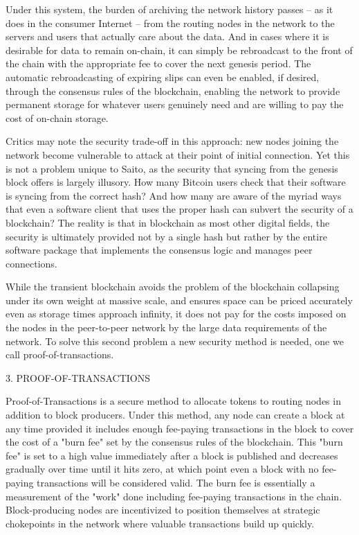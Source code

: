\documentclass[11.5pt, oneside]{article}   	%
\begin{document}
\begin{multicols}{2}
Under this system, the burden of archiving the network history passes -- as it does in the consumer Internet -- from the routing nodes in the network to the servers and users that actually care about the data. And in cases where it is desirable for data to remain on-chain, it can simply be rebroadcast to the front of the chain with the appropriate fee to cover the next genesis period. The automatic rebroadcasting of expiring slips can even be enabled, if desired, through the consensus rules of the blockchain, enabling the network to provide permanent storage for whatever users genuinely need and are willing to pay the cost of on-chain storage.

Critics may note the security trade-off in this approach: new nodes joining the network become vulnerable to attack at their point of initial connection. Yet this is not a problem unique to Saito, as the security that syncing from the genesis block offers is largely illusory. How many Bitcoin users check that their software is syncing from the correct hash? And how many are aware of the myriad ways that even a software client that uses the proper hash can subvert the security of a blockchain? The reality is that in blockchain as most other digital fields, the security is ultimately provided not by a single hash but rather by the entire software package that implements the consensus logic and manages peer connections.

While the transient blockchain avoids the problem of the blockchain collapsing under its own weight at massive scale, and ensures space can be priced accurately even as storage times approach infinity, it does not pay for the costs imposed on the nodes in the peer-to-peer network by the large data requirements of the network. To solve this second problem a new security method is needed, one we call proof-of-transactions.

3. PROOF-OF-TRANSACTIONS

Proof-of-Transactions is a secure method to allocate tokens to routing nodes in addition to block producers. Under this method, any node can create a block at any time provided it includes enough fee-paying transactions in the block to cover the cost of a "burn fee" set by the consensus rules of the blockchain. This "burn fee" is set to a high value immediately after a block is published and decreases gradually over time until it hits zero, at which point even a block with no fee-paying transactions will be considered valid. The burn fee is essentially a measurement of the "work" done including fee-paying transactions in the chain. Block-producing nodes are incentivized to position themselves at strategic chokepoints in the network where valuable transactions build up quickly.


\end{multicols}
\end{document}
